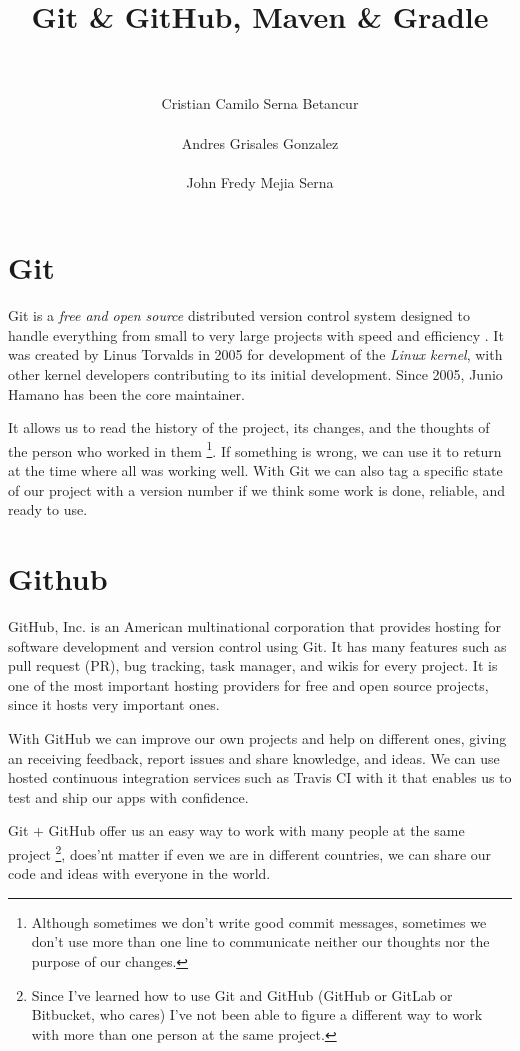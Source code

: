 \documentclass[a4paper,11pt]{article}
\title{Git \& GitHub, Maven \& Gradle}
\author{\\\\ Cristian Camilo Serna Betancur \\\\ Andres Grisales Gonzalez  \\\\ John Fredy Mejia Serna}
\begin{document}
\maketitle
\tableofcontents

\section{Git}
Git is a \emph{free and open source} distributed version control system designed 
to handle everything from small to very large projects with speed and efficiency
\cite{GIT:1}. It was created by Linus Torvalds in 2005 for development of the 
\emph{Linux kernel}, with other kernel developers contributing to its initial 
development. Since 2005, Junio Hamano has been the core maintainer\cite{GIT:2}.

It allows us to read the history of the project, its changes, and the thoughts 
of the person who worked in them \footnote{Although sometimes we don't write 
good commit messages, sometimes we don't use more than one line to communicate 
neither our thoughts nor the purpose of our changes.}. If something is wrong, 
we can use it to return at the time where all was working well. With Git we can 
also tag a specific state of our project with a version number if we think some 
work is done, reliable, and ready to use.

\section{Github}
GitHub, Inc. is an American multinational corporation that provides hosting for 
software development and version control using Git\cite{GITHUB:1}. It has many 
features such as pull request (PR), bug tracking, task manager, and wikis for 
every project. It is one of the most important hosting providers for free and 
open source projects, since it hosts very important ones.

With GitHub we can improve our own projects and help on different ones, giving 
an receiving feedback, report issues and share knowledge, and ideas. We can use
hosted continuous integration services such as Travis CI with it that enables us
to test and ship our apps with confidence\cite{TRAVIS:1}.

Git $+$ GitHub offer us an easy way to work with many people at the same project
\footnote{Since I've learned how to use Git and GitHub (GitHub or GitLab or 
Bitbucket, who cares) I've not been able to figure a different way to work with 
more than one person at the same project.}, does'nt matter if even we are in 
different countries, we can share our code and ideas with everyone in the world.
\end{document}
